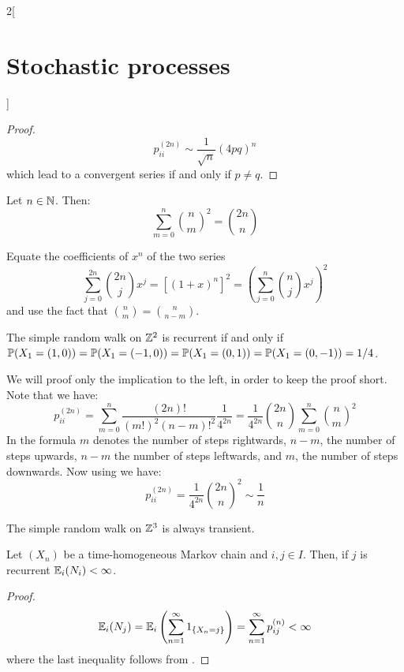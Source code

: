 \documentclass[../../../main_math.tex]{subfiles}
\begin{document}
\begin{multicols}{2}[\section{Stochastic processes}]
\begin{proof}
    \begin{equation}\label{SP:stirling_polya1}
      p_{ii}^{(2n)}\sim \frac{1}{\sqrt{n}}{(4pq)}^n
    \end{equation}
    which lead to a convergent series if and only if $p\ne q$.
  \end{proof}
  \begin{lemma}\label{SP:2n-n_convinatoria}
    Let $n\in\mathbb{N}$. Then:
    $$
      \sum_{m=0}^{n}\binom{n}{m}^2=\binom{2n}{n}
    $$
  \end{lemma}
  \begin{sproof}
    Equate the coefficients of $x^n$ of the two series
    $$
      \sum_{j=0}^{2n}\binom{2n}{j}x^j={[{(1+x)}^{n}]}^2={\left(\sum_{j=0}^n\binom{n}{j}x^j\right)}^2
    $$
    and use the fact that $\binom{n}{m}=\binom{n}{n-m}$.
  \end{sproof}
  \begin{theorem}
    The simple random walk on $\mathbb{Z}^2$ is recurrent if and only if $\mathbb{P}(X_1=(1,0))=\mathbb{P}(X_1=(-1,0))=\mathbb{P}(X_1=(0,1))=\mathbb{P}(X_1=(0,-1))=1/4$.
  \end{theorem}
  \begin{sproof}
    We will proof only the implication to the left, in order to keep the proof short. Note that we have:
    $$
      p_{ii}^{(2n)}=\sum_{m=0}^{n}\frac{(2n)!}{{(m!)}^2{(n-m)!}^2}\frac{1}{4^{2n}}=\frac{1}{4^{2n}}\binom{2n}{n}\sum_{m=0}^n \binom{n}{m}^2
    $$
    In the formula $m$ denotes the number of steps rightwards, $n-m$, the number of steps upwards, $n-m$ the number of steps leftwards, and $m$, the number of steps downwards. Now using  we have:
    $$
      p_{ii}^{(2n)}=\frac{1}{4^{2n}}\binom{2n}{n}^2\sim \frac{1}{n}
    $$
  \end{sproof}
  \begin{theorem}
    The simple random walk on $\mathbb{Z}^3$ is always transient.
  \end{theorem}
  \begin{corollary}
    Let $(X_n)$ be a time-homogeneous Markov chain and $i,j\in I$. Then, if $j$ is recurrent $\mathbb{E}_i(N_i)<\infty$.
  \end{corollary}
  \begin{proof}
    $$
      \mathbb{E}_i(N_j)=\mathbb{E}_i\left(\sum_{n=1}^{\infty}1_{\{X_n=j\}}\right)=\sum_{n=1}^{\infty}p_{ij}^{(n)}<\infty
    $$
    where the last inequality follows from .
  \end{proof}

\end{multicols}
\end{document}
